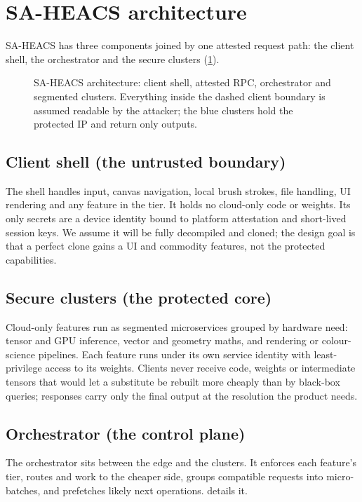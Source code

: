 \section{SA-HEACS architecture}\label{sec:arch}

SA-HEACS has three components joined by one attested request path: the client shell, the
orchestrator and the secure clusters (\cref{fig:arch}).

\begin{figure}[htbp]
\centering

\caption{SA-HEACS architecture: client shell, attested RPC, orchestrator and segmented
clusters. Everything inside the dashed client boundary is assumed readable by the attacker;
the blue clusters hold the protected IP and return only outputs.}
\label{fig:arch}
\end{figure}

\subsection{Client shell (the untrusted boundary)}
The shell handles input, canvas navigation, local brush strokes, file handling, UI
rendering and any feature in the  tier. It holds no cloud-only code or
weights. Its only secrets are a device identity bound to platform attestation and
short-lived session keys. We assume it will be fully decompiled and cloned; the design goal
is that a perfect clone gains a UI and commodity features, not the protected capabilities.

\subsection{Secure clusters (the protected core)}
Cloud-only features run as segmented microservices grouped by hardware need: tensor and GPU
inference, vector and geometry maths, and rendering or colour-science pipelines. Each
feature runs under its own service identity with least-privilege access to its weights.
Clients never receive code, weights or intermediate tensors that would let a substitute be
rebuilt more cheaply than by black-box queries; responses carry only the final output at the
resolution the product needs.

\subsection{Orchestrator (the control plane)}
The orchestrator sits between the edge and the clusters. It enforces each feature's tier,
routes  and  work to the cheaper side, groups compatible
requests into micro-batches, and prefetches likely next operations.  details
it.

